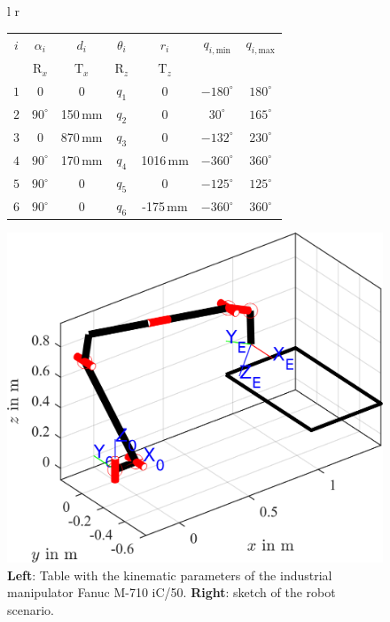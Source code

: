 \documentclass[robotics,article,accept,moreauthors,pdftex]{Definitions/mdpi}
\begin{document}
\begin{figure}[H]
\begin{tabular}[t]{l r}
		\begin{tabular}[t]{|c|c|c|c|c|c|c|}
			\hline
			$i$ & $\alpha_i$ & $d_i$ & $\theta_i$ & $r_i$ & $q_{i,\mathrm{min}}$ & $q_{i,\mathrm{max}}$ \\
			& $\mathrm{R}_x$ & $\mathrm{T}_x$ & $\mathrm{R}_z$ & $\mathrm{T}_z$ & & \\
			\hline
			$1$ & $0$ & $0$ & $q_1$ & $0$ & $-180^\circ$ & $180^\circ$ \\
			$2$ & $90^\circ$ & 150\,mm & $q_2$ & $0$ & $30^\circ$ & $165^\circ$ \\
			$3$ & $0$ & 870\,mm & $q_3$ & $0$ & $-132^\circ$ & $230^\circ$ \\
			$4$ & $90^\circ$ & 170\,mm & $q_4$ & 1016\,mm & $-360^\circ$ & $360^\circ$ \\
			$5$ & $90^\circ$ & $0$ & $q_5$ & $0$ & $-125^\circ$ & $125^\circ$ \\
			$6$ & $90^\circ$ & $0$ & $q_6$ & -175\,mm & $-360^\circ$ & $360^\circ$ \\
			\hline
		\end{tabular}
    \begin{minipage}[t]{7.5cm}
    	\vspace{0.001cm} %
    	\hspace{1cm} %
		\includegraphics[trim=30 30 0 30, clip, scale=0.7]{serrob_traj_zero_pose.png} %
    \end{minipage}
\end{tabular}
\caption{\textbf{Left}: Table with the kinematic parameters of the industrial manipulator Fanuc M-710 iC/50. \textbf{Right}: sketch of the robot scenario.}
\label{tab:mdh_industrialrobot}
\end{figure}
\end{document}
